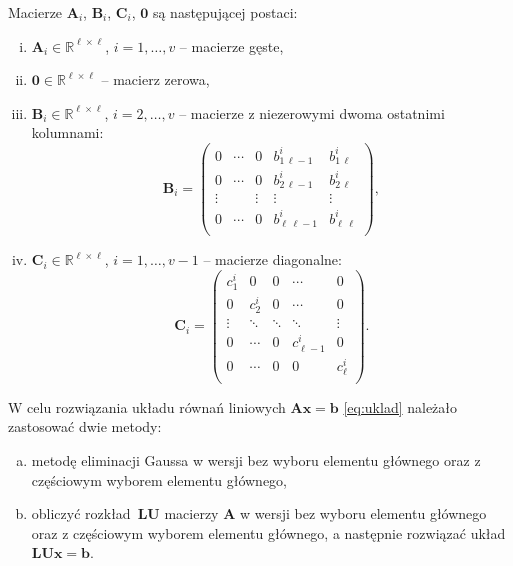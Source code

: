 \documentclass{mk-polish-lab-report}
\newcommand{\mA}{\bm{A}}
\newcommand{\mB}{\bm{B}}
\newcommand{\mC}{\bm{C}}
\newcommand{\mL}{\bm{L}}
\newcommand{\mU}{\bm{U}}
\newcommand{\mZ}{\bm{0}}
\newcommand{\vb}{\bm{b}}
\newcommand{\vx}{\bm{x}}
\newcommand{\R}{\mathbb{R}}
\begin{document}
\noindent Macierze $\mA_i$, $\mB_i$, $\mC_i$, $\mZ$ są następującej postaci:
\begin{enumerate}[(i)]
\item $\mA_i \in \R^{\ell\times \ell}$,   $i = 1, \ldots,v$ -- macierze gęste,
\item $\mZ \in \R^{\ell\times \ell}$ -- macierz zerowa, 
\item $\mB_i \in \R^{\ell\times \ell}$,   $i = 2, \ldots,v$ -- macierze z niezerowymi dwoma ostatnimi kolumnami:
\begin{equation}
\mB_i =
\left(\begin{array}{ccccc}
0 & \cdots & 0 & b_{1\,\ell-1}^i & b_{1\,\ell}^i \\
0 & \cdots & 0 & b_{2\,\ell-1}^i & b_{2\,\ell}^i \\
\vdots & & \vdots & \vdots & \vdots \\
0 & \cdots & 0 & b_{\ell\,\ell-1}^i & b_{\ell\,\ell}^i \\
\end{array}\right),
\end{equation} 
\item $\mC_i \in \R^{\ell\times \ell}$,   $i = 1, \ldots,v\!-\!1$ -- macierze diagonalne:
\begin{equation}
\mC_i =
\left(\begin{array}{ccccc}
 c_{1}^i & 0 & 0 & \cdots & 0  \\
0 &  c_{2}^i &  0 & \cdots & 0  \\
\vdots &  \ddots &  \ddots & \ddots & \vdots  \\
0 & \cdots & 0 &  c_{\ell-1}^i & 0 \\
0 & \cdots & 0 &  0 & c_{\ell}^i \\
\end{array}\right).
\end{equation} 
\end{enumerate}

\noindent W celu rozwiązania układu równań liniowych $\mA\vx = \vb$ \eqref{eq:uklad} należało zastosować dwie metody:
\begin{enumerate}[(a)]
\item metodę eliminacji Gaussa w wersji bez wyboru elementu głównego oraz z częściowym wyborem elementu głównego,   
\item obliczyć rozkład~$\mL\mU$ macierzy $\mA$ w wersji bez wyboru elementu głównego oraz z częściowym wyborem elementu głównego, a następnie rozwiązać układ $\mL\mU\vx = \vb$.
\end{enumerate}
\end{document}

